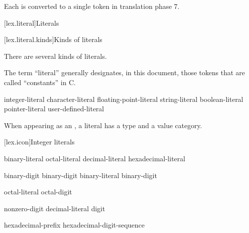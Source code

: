 Each  is converted to a single token
in translation phase 7.%
%

[lex.literal]{Literals}%

[lex.literal.kinds]{Kinds of literals}

\pnum
{}%
%
There are several kinds of literals.
\begin{footnote}
The term ``literal'' generally designates, in this
document, those tokens that are called ``constants'' in C.
\end{footnote}

\begin{bnf}
\br
    integer-literal\br
    character-literal\br
    floating-point-literal\br
    string-literal\br
    boolean-literal\br
    pointer-literal\br
    user-defined-literal
\end{bnf}
\begin{note}
When appearing as an ,
a literal has a type and a value category.
\end{note}

[lex.icon]{Integer literals}

%
\begin{bnf}
\br
    binary-literal \br
    octal-literal \br
    decimal-literal \br
    hexadecimal-literal 
\end{bnf}

\begin{bnf}
\br
     binary-digit\br
     binary-digit\br
    binary-literal  binary-digit
\end{bnf}

\begin{bnf}
\br
    \br
    octal-literal  octal-digit
\end{bnf}

\begin{bnf}
\br
    nonzero-digit\br
    decimal-literal  digit
\end{bnf}

\begin{bnf}
\br
    hexadecimal-prefix hexadecimal-digit-sequence
\end{bnf}

